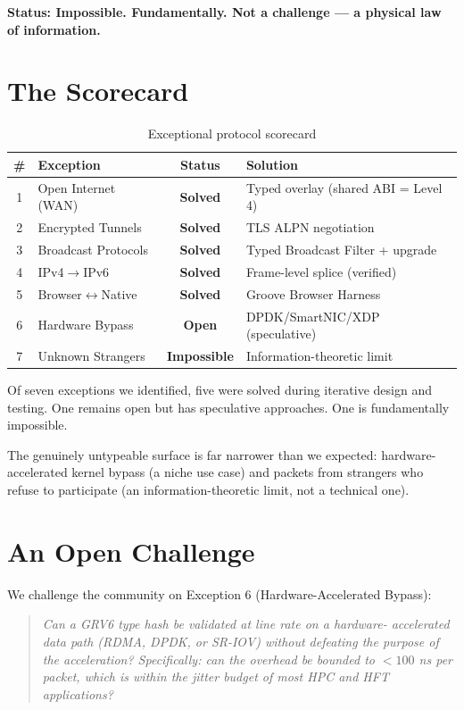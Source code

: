 \documentclass[11pt,a4paper]{article}
\begin{document}
\textbf{Status: Impossible. Fundamentally. Not a challenge --- a
physical law of information.}

\section{The Scorecard}

\begin{table}[h]
\centering
\small
\begin{tabular}{clcl}
\toprule
\# & Exception & Status & Solution \\
\midrule
1 & Open Internet (WAN) & \textbf{Solved} & Typed overlay (shared ABI = Level 4) \\
2 & Encrypted Tunnels & \textbf{Solved} & TLS ALPN negotiation \\
3 & Broadcast Protocols & \textbf{Solved} & Typed Broadcast Filter + upgrade \\
4 & IPv4$\rightarrow$IPv6 & \textbf{Solved} & Frame-level splice (verified) \\
5 & Browser$\leftrightarrow$Native & \textbf{Solved} & Groove Browser Harness \\
6 & Hardware Bypass & \textbf{Open} & DPDK/SmartNIC/XDP (speculative) \\
7 & Unknown Strangers & \textbf{Impossible} & Information-theoretic limit \\
\bottomrule
\end{tabular}
\caption{Exceptional protocol scorecard}
\label{tab:scorecard}
\end{table}

Of seven exceptions we identified, five were solved during iterative
design and testing. One remains open but has speculative approaches. One
is fundamentally impossible.

The genuinely untypeable surface is far narrower than we expected:
hardware-accelerated kernel bypass (a niche use case) and packets from
strangers who refuse to participate (an information-theoretic limit, not
a technical one).

\section{An Open Challenge}

We challenge the community on Exception 6 (Hardware-Accelerated Bypass):

\begin{quote}
\emph{Can a GRV6 type hash be validated at line rate on a hardware-
accelerated data path (RDMA, DPDK, or SR-IOV) without defeating the
purpose of the acceleration? Specifically: can the overhead be bounded
to $< 100$ ns per packet, which is within the jitter budget of most
HPC and HFT applications?}
\end{quote}
\end{document}
